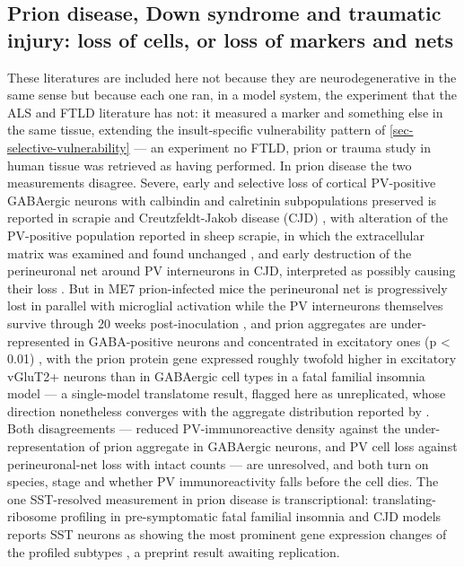 \documentclass[11pt]{article}
\begin{document}
\subsection{Prion disease, Down syndrome and traumatic injury: loss of cells, or loss of markers and nets}
\label{sec-07-markers-and-nets}

These literatures are included here not because they are neurodegenerative in the same sense but because each one ran, in a model system, the experiment that the ALS and FTLD literature has not: it measured a marker and something else in the same tissue, extending the insult-specific vulnerability pattern of \ref{sec-selective-vulnerability} --- an experiment no FTLD, prion or trauma study in human tissue was retrieved as having performed. In prion disease the two measurements disagree. Severe, early and selective loss of cortical PV-positive GABAergic neurons with calbindin and calretinin subpopulations preserved is reported in scrapie and Creutzfeldt-Jakob disease (CJD) \citep{Guentchev1998}, with alteration of the PV-positive population reported in sheep scrapie, in which the extracellular matrix was examined and found unchanged \citep{Vidal2006}, and early destruction of the perineuronal net around PV interneurons in CJD, interpreted as possibly causing their loss \citep{Belichenko1999}. But in ME7 prion-infected mice the perineuronal net is progressively lost in parallel with microglial activation while the PV interneurons themselves survive through 20 weeks post-inoculation \citep{Franklin2008}, and prion aggregates are under-represented in GABA-positive neurons and concentrated in excitatory ones (p < 0.01) \citep{Erdenebat2024}, with the prion protein gene expressed roughly twofold higher in excitatory vGluT2+ neurons than in GABAergic cell types in a fatal familial insomnia model \citep{Bauer2022b} --- a single-model translatome result, flagged here as unreplicated, whose direction nonetheless converges with the aggregate distribution reported by \citet{Erdenebat2024}. Both disagreements --- reduced PV-immunoreactive density against the under-representation of prion aggregate in GABAergic neurons, and PV cell loss against perineuronal-net loss with intact counts --- are unresolved, and both turn on species, stage and whether PV immunoreactivity falls before the cell dies. The one SST-resolved measurement in prion disease is transcriptional: translating-ribosome profiling in pre-symptomatic fatal familial insomnia and CJD models reports SST neurons as showing the most prominent gene expression changes of the profiled subtypes \citep{Bauer2022a}, a preprint result awaiting replication.
\end{document}
